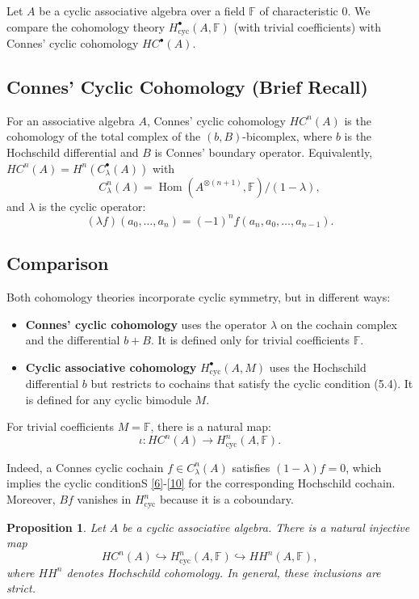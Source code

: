 \documentclass[pdflatex,sn-mathphys-num]{sn-jnl}%
\theoremstyle{thmstyleone}%
\newtheorem{proposition}[theorem]{Proposition}%
\theoremstyle{thmstyletwo}%
\theoremstyle{thmstylethree}%
\begin{document}
Let $A$ be a cyclic associative algebra over a field $\mathbb{F}$ of characteristic $0$. We compare the cohomology theory $H^\bullet_{\mathrm{cyc}}(A, \mathbb{F})$ (with trivial coefficients) with Connes' cyclic cohomology $HC^\bullet(A)$.

\subsection{Connes' Cyclic Cohomology (Brief Recall)}

For an associative algebra $A$, Connes' cyclic cohomology $HC^n(A)$ is the cohomology of the total complex of the $(b, B)$-bicomplex, where $b$ is the Hochschild differential and $B$ is Connes' boundary operator. Equivalently, $HC^n(A) = H^n(C^\bullet_\lambda(A))$ with
\[
C^n_\lambda(A) = \operatorname{Hom}(A^{\otimes (n+1)}, \mathbb{F}) / (1 - \lambda),
\]
and $\lambda$ is the cyclic operator:
\[
(\lambda f)(a_0, \dots, a_n) = (-1)^n f(a_n, a_0, \dots, a_{n-1}).
\]

\subsection{Comparison}

Both cohomology theories incorporate cyclic symmetry, but in different ways:

\begin{itemize}
\item \textbf{Connes' cyclic cohomology} uses the operator $\lambda$ on the cochain complex and the differential $b + B$. It is defined only for trivial coefficients $\mathbb{F}$.
\item \textbf{Cyclic associative cohomology} $H^\bullet_{\mathrm{cyc}}(A, M)$ uses the Hochschild differential $b$ but restricts to cochains that satisfy the cyclic condition (5.4). It is defined for any cyclic bimodule $M$.
\end{itemize}

For trivial coefficients $M = \mathbb{F}$, there is a natural map:
\[
\iota: HC^n(A) \longrightarrow H^n_{\mathrm{cyc}}(A, \mathbb{F}).
\]

Indeed, a Connes cyclic cochain $f \in C^n_\lambda(A)$ satisfies $(1-\lambda)f = 0$, which implies the cyclic conditionS \ref{6}-\ref{10} for the corresponding Hochschild cochain. Moreover, $Bf$ vanishes in $H^n_{\mathrm{cyc}}$ because it is a coboundary.



\begin{proposition}\label{prop:comparison}
Let $A$ be a cyclic associative algebra. There is a natural injective map
\[
HC^n(A) \hookrightarrow H^n_{\mathrm{cyc}}(A, \mathbb{F}) \hookrightarrow HH^n(A, \mathbb{F}),
\]
where $HH^n$ denotes Hochschild cohomology. In general, these inclusions are strict.
\end{proposition}
\end{document}
